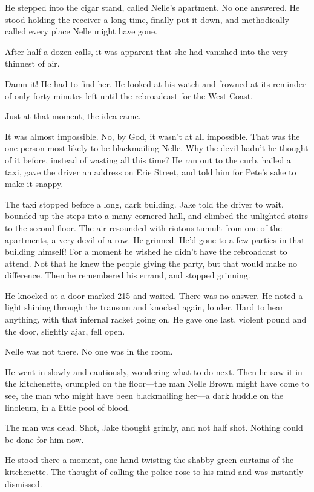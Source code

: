 \documentclass{novel}
\begin{document}
He stepped into the cigar stand, called Nelle's apartment. No one answered. He stood holding the receiver a long time, finally put it down, and methodically called every place Nelle might have gone.

After half a dozen calls, it was apparent that she had vanished into the very thinnest of air.

Damn it! He had to find her. He looked at his watch and frowned at its reminder of only forty minutes left until the rebroadcast for the West Coast.

Just at that moment, the idea came.

It was almost impossible. No, by God, it wasn't at all impossible. That was the one person most likely to be blackmailing Nelle. Why the devil hadn't he thought of it before, instead of wasting all this time? He ran out to the curb, hailed a taxi, gave the driver an address on Erie Street, and told him for Pete's sake to make it snappy.

The taxi stopped before a long, dark building. Jake told the driver to wait, bounded up the steps into a many-cornered hall, and climbed the unlighted stairs to the second floor. The air resounded with riotous tumult from one of the apartments, a very devil of a row. He grinned. He'd gone to a few parties in that building himself! For a moment he wished he didn't have the rebroadcast to attend. Not that he knew the people giving the party, but that would make no difference. Then he remembered his errand, and stopped grinning.

He knocked at a door marked 215 and waited. There was no answer. He noted a light shining through the transom and knocked again, louder. Hard to hear anything, with that infernal racket going on. He gave one last, violent pound and the door, slightly ajar, fell open.

Nelle was not there. No one was in the room.

He went in slowly and cautiously, wondering what to do next. Then he saw it in the kitchenette, crumpled on the floor—the man Nelle Brown might have come to see, the man who might have been blackmailing her—a dark huddle on the linoleum, in a little pool of blood.

The man was dead. Shot, Jake thought grimly, and not half shot. Nothing could be done for him now.

He stood there a moment, one hand twisting the shabby green curtains of the kitchenette. The thought of calling the police rose to his mind and was instantly dismissed.
\end{document}
